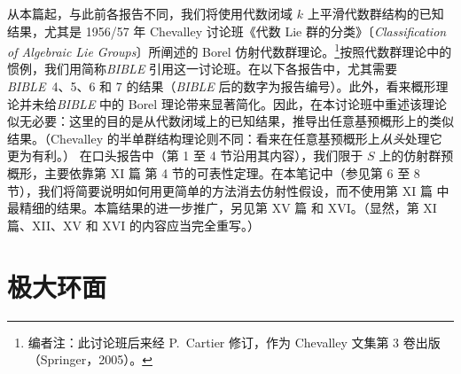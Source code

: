 
\setcounter{footnote}{-1}
\begin{NoHyper}
\end{NoHyper}
从本篇起，与此前各报告不同，我们将使用代数闭域 \(k\) 上平滑代数群结构的已知结果，尤其是 1956/57 年 Chevalley 讨论班《代数 Lie 群的分类》〔\emph{Classification of Algebraic Lie Groups}〕所阐述的 Borel 仿射代数群理论。\footnote{编者注：此讨论班后来经 P.~Cartier 修订，作为 Chevalley 文集第 3 卷出版（Springer，2005）。}按照代数群理论中的惯例，我们用简称\emph{BIBLE} 引用这一讨论班。在以下各报告中，尤其需要\emph{BIBLE}~4、5、6 和 7 的结果（\emph{BIBLE} 后的数字为报告编号）。此外，看来概形理论并未给\emph{BIBLE} 中的 Borel 理论带来显著简化。因此，在本讨论班中重述该理论似无必要：这里的目的是从代数闭域上的已知结果，推导出任意基预概形上的类似结果。（Chevalley 的半单群结构理论则不同：看来在任意基预概形上\emph{从头}处理它更为有利。）
在口头报告中（第 1 至 4 节沿用其内容），我们限于 \(S\) 上的仿射群预概形，主要依靠第 XI 篇 第 4 节的可表性定理。在本笔记中（参见第 6 至 8 节），我们将简要说明如何用更简单的方法消去仿射性假设，而不使用第 XI 篇 中最精细的结果。本篇结果的进一步推广，另见第 XV 篇 和 XVI。（显然，第 XI 篇、XII、XV 和 XVI 的内容应当完全重写。）
\section{极大环面}
